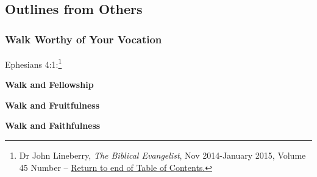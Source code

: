 \subsection{Outlines from Others}

\subsubsection{Walk Worthy of Your Vocation}
Ephesians 4:1:\footnote{Dr John Lineberry, \emph{The Biblical Evangelist}, Nov 2014-January 2015, Volume 45 Number -- \textcolor[rgb]{0.00,0.25,0.00}{\hyperlink{PsalmsTOC}{Return to end of Table of Contents.}}}
\begin{compactenum}[I.]
    \item \textbf{Walk and Fellowship} 
    \item \textbf{Walk and Fruitfulness}
    \item \textbf{Walk and Faithfulness} 
\end{compactenum}

